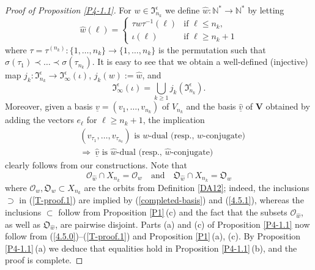 \documentclass{amsart}
\theoremstyle{definition}
\newcommand{\bs}[1]{\boldsymbol{#1}}
\begin{document}
\begin{proof}[Proof of Proposition \ref{P4-1.1}]
For $w\in\mathfrak{I}_{n_k}^\epsilon$ we define $\hat{w}:\mathbb{N}^*\to\mathbb{N}^*$ by letting
\[\hat{w}(\ell)=\left\{
\begin{array}{ll}
\tau w\tau^{-1}(\ell) & \mbox{if $\ell\leq n_k$,} \\
\iota(\ell) & \mbox{if $\ell\geq n_k+1$}
\end{array}
\right.\]
where $\tau=\tau^{(n_k)}:\{1,\ldots,n_k\}\to\{1,\ldots,n_k\}$ is the
permutation such that $\sigma(\tau_1)\prec\ldots\prec\sigma(\tau_{n_k})$.
It is easy to see that we obtain a well-defined (injective) map
$j_k:\mathfrak{I}_{n_k}^\epsilon\to\mathfrak{I}_\infty^\epsilon(\iota)$, $j_k(w):=\hat{w}$,
and
\begin{equation}
\label{4.5.0}
\mathfrak{I}_\infty^\epsilon(\iota)=\bigcup_{k\geq 1}j_k(\mathfrak{I}_{n_k}^\epsilon).\end{equation}
Moreover,
given a basis $\underline{v}=(v_1,\ldots,v_{n_k})$ of $V_{n_k}$ and
the basis $\underline{\hat{v}}$ of $\mathbf{V}$ obtained by adding the vectors $e_\ell$ for $\ell\geq n_k+1$,
the implication
\begin{eqnarray}
\label{4.5.1}
 & \mbox{$(v_{\tau_1},\ldots,v_{\tau_{n_k}})$ is $w$-dual (resp., $w$-conjugate)} \\
\nonumber
 & \Rightarrow \
\mbox{$\underline{\hat{v}}$ is $\hat{w}$-dual (resp., $\hat{w}$-conjugate)}
\end{eqnarray}
clearly follows from our constructions.
Note that
\begin{equation}
\label{T-proof.1}
\bs{\mathcal{O}}_{\hat{w}}\cap X_{n_k}=\mathcal{O}_{w}
\quad
\mbox{and}
\quad
\bs{\mathfrak{O}}_{\hat{w}}\cap X_{n_k}=\mathfrak{O}_{w}
\end{equation}
where $\mathcal{O}_w,\mathfrak{O}_w\subset X_{n_k}$ are the orbits from Definition \ref{DA12};
indeed, the inclusions $\supset$ in (\ref{T-proof.1}) are implied by 
(\ref{completed-basis}) and (\ref{4.5.1}),
whereas the inclusions $\subset$ follow from 
Proposition \ref{P1}\,{\rm (c)}
and the fact that the subsets $\bs{\mathcal{O}}_{\hat{w}}$, as well as $\bs{\mathfrak{O}}_{\hat{w}}$,
are pairwise disjoint.
Parts {\rm (a)} and {\rm (c)} of Proposition \ref{P4-1.1} now follow
from (\ref{4.5.0})--(\ref{T-proof.1}) and Proposition \ref{P1}\,{\rm (a)}, {\rm (c)}. By Proposition \ref{P4-1.1}\,{\rm (a)} we deduce that equalities hold in Proposition \ref{P4-1.1}\,{\rm (b)}, and the proof is complete.
\end{proof}
\end{document}
